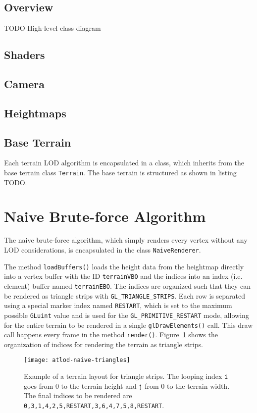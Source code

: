 \subsection{Overview}
TODO High-level class diagram

\subsection{Shaders}

\subsection{Camera}

\subsection{Heightmaps}

\subsection{Base Terrain}
Each terrain LOD algorithm is encapsulated in a class, which inherits from the base terrain class \texttt{Terrain}.
The base terrain is structured as shown in listing TODO.

\section{Naive Brute-force Algorithm}
The naive brute-force algorithm, which simply renders every vertex without any LOD considerations, is encapsulated in the class \texttt{NaiveRenderer}.

The method \texttt{loadBuffers()} loads the height data from the heightmap directly into a vertex buffer with the ID \texttt{terrainVBO} and the indices into an index (i.e. element) buffer named \texttt{terrainEBO}.
The indices are organized such that they can be rendered as triangle strips with \texttt{GL\_TRIANGLE\_STRIPS}.
Each row is separated using a special marker index named \texttt{RESTART}, which is set to the maximum possible \texttt{GLuint} value and is used for the \texttt{GL\_PRIMITIVE\_RESTART} mode,
allowing for the entire terrain to be rendered in a single \texttt{glDrawElements()} call. This draw call happens every frame in the 
method \texttt{render()}. Figure~\ref{fig:naive-triangles} shows the organization of indices for rendering the terrain as triangle strips.

\begin{figure}[H]
  \centering
  \texttt{[image: atlod-naive-triangles]}
  \caption{Example of a terrain layout for triangle strips. The looping index \texttt{i} goes from 0 to the terrain height and \texttt{j} from 0 to the terrain width. The final indices to be rendered are \texttt{0,3,1,4,2,5,RESTART,3,6,4,7,5,8,RESTART}.}\label{fig:naive-triangles}
\end{figure}

